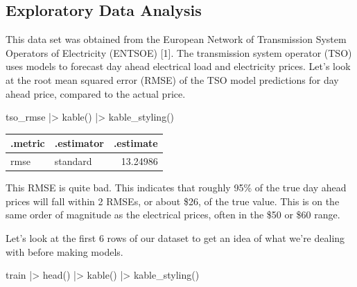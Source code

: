 \documentclass[
]{article}
\newenvironment{Shaded}{\begin{snugshade}}{\end{snugshade}}
\newcommand{\FunctionTok}[1]{\textcolor[rgb]{0.28,0.35,0.67}{#1}}
\newcommand{\NormalTok}[1]{\textcolor[rgb]{0.00,0.23,0.31}{#1}}
\newcommand{\SpecialCharTok}[1]{\textcolor[rgb]{0.37,0.37,0.37}{#1}}
\begin{document}
\subsection{Exploratory Data Analysis}\label{exploratory-data-analysis}

This data set was obtained from the European Network of Transmission
System Operators of Electricity (ENTSOE) {[}1{]}. The transmission
system operator (TSO) uses models to forecast day ahead electrical load
and electricity prices. Let's look at the root mean squared error (RMSE)
of the TSO model predictions for day ahead price, compared to the actual
price.

\begin{Shaded}
\begin{Highlighting}[]
\NormalTok{tso\_rmse }\SpecialCharTok{|\textgreater{}}
  \FunctionTok{kable}\NormalTok{() }\SpecialCharTok{|\textgreater{}}
  \FunctionTok{kable\_styling}\NormalTok{()}
\end{Highlighting}
\end{Shaded}

\begin{longtable*}[t]{llr}
\toprule
.metric & .estimator & .estimate\\
\midrule
rmse & standard & 13.24986\\
\bottomrule
\end{longtable*}

This RMSE is quite bad. This indicates that roughly 95\% of the true day
ahead prices will fall within 2 RMSEs, or about \$26, of the true value.
This is on the same order of magnitude as the electrical prices, often
in the \$50 or \$60 range.

Let's look at the first 6 rows of our dataset to get an idea of what
we're dealing with before making models.

\begin{Shaded}
\begin{Highlighting}[]
\NormalTok{train }\SpecialCharTok{|\textgreater{}}
  \FunctionTok{head}\NormalTok{() }\SpecialCharTok{|\textgreater{}}
  \FunctionTok{kable}\NormalTok{() }\SpecialCharTok{|\textgreater{}}
  \FunctionTok{kable\_styling}\NormalTok{()}
\end{Highlighting}
\end{Shaded}
\end{document}
